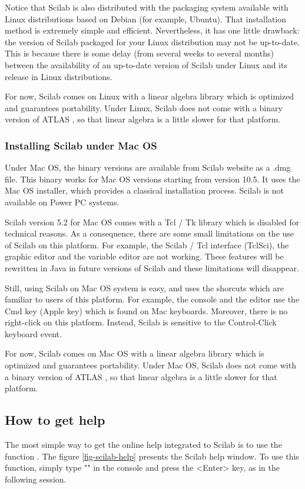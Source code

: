 Notice that Scilab is also distributed with the packaging system available 
with Linux distributions based on Debian (for example, Ubuntu). 
That installation method is extremely simple and efficient. 
Nevertheless, it has one little drawback: the version of Scilab packaged for your Linux distribution
may not be up-to-date. This is because there is some delay (from 
several weeks to several months) between the availability of an up-to-date version 
of Scilab under Linux and its release in Linux 
distributions.

For now, Scilab comes on Linux with a linear algebra library which is optimized 
and guarantees portability.
Under Linux, Scilab does not come with a binary version of ATLAS \cite{AtlasWWW},
so that linear algebra is a little slower for that platform.

\subsubsection{Installing Scilab under Mac OS}
Under Mac OS, the binary versions are available from Scilab 
website as a .dmg file. This binary works for Mac OS versions 
starting from version 10.5. It uses the Mac OS installer, which 
provides a classical installation process. 
Scilab is not available on Power PC systems. 

Scilab version 5.2 for Mac OS comes with a Tcl / Tk library which is disabled 
for technical reasons.
As a consequence, there are some small limitations on the 
use of Scilab on this platform. For example, the Scilab / Tcl interface (TclSci), the 
graphic editor and the variable editor are not working.
These features will be rewritten in Java in future versions of 
Scilab and these limitations will disappear.

Still, using Scilab on Mac OS system is easy, and uses the 
shorcuts which are familiar to users of this platform. For example, 
the console and the editor use the Cmd key (Apple key) which is 
found on Mac keyboards. Moreover, there is no right-click 
on this platform. Instead, Scilab is sensitive to the 
Control-Click keyboard event. 

For now, Scilab comes on Mac OS with a linear algebra library which is optimized 
and guarantees portability.
Under Mac OS, Scilab does not come with a binary version of ATLAS \cite{AtlasWWW},
so that linear algebra is a little slower for that platform.

\subsection{How to get help}
The most simple way to get the online help integrated to 
Scilab is to use the function . 
The figure \ref{fig-scilab-help} presents the Scilab help window.
To use this function, simply type "" in the console 
and press the <Enter> key, as in the following session.

